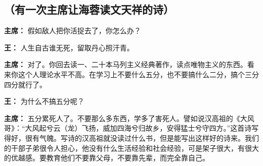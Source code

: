 \subsection{（有一次主席让海蓉读文天祥的诗）}

\begin{duihua}
\item[\textbf{主席：}] 假如敌人把你活捉去了，你怎么办？

\item[\textbf{王：}] 人生自古谁无死，留取丹心照汗青。

\item[\textbf{主席：}] 对了。你回去读一、二十本马列主义经典著作，读点唯物主义的东西。看来你这个人理论水平不高。在学习上不要什么五分，也不要搞什么二分，搞个三分四分就行了。

\item[\textbf{王：}] 为什么不搞五分呢？

\item[\textbf{主席：}] 五分累死人了。不要那么多东西，学多了害死人。譬如说汉高祖的《大风哥》：“大风起兮云（龙）飞扬，威加四海兮归故乡，安得猛士兮守四方。”这首诗写得好，很有气魄。写诗的汉高祖就没读过什么书，但是能写出这样好的诗来。我们的干部子弟很令人担心，他没有什么生活经验和社会经验，可是架子很大，有很大的优越感。要教育他们不要靠父母，不要靠先辈，而完全靠自己。
\end{duihua}

